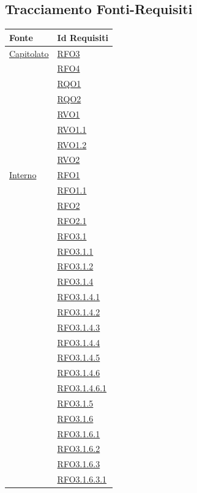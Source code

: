 \subsection{Tracciamento Fonti-Requisiti}
\normalsize
\begin{longtable}{|>{\centering}m{5cm}|m{5cm}<{\centering}|}
\hline
\textbf{Fonte} & \textbf{Id Requisiti}\\
\hline
\endhead
\hyperlink{Capitolato}{Capitolato} & \hyperlink{RFO3}{RFO3}\\
& \hyperlink{RFO4}{RFO4}\\
& \hyperlink{RQO1}{RQO1}\\
& \hyperlink{RQO2}{RQO2}\\
& \hyperlink{RVO1}{RVO1}\\
& \hyperlink{RVO1.1}{RVO1.1}\\
& \hyperlink{RVO1.2}{RVO1.2}\\
& \hyperlink{RVO2}{RVO2}\\ \hline
\hyperlink{Interno}{Interno} & \hyperlink{RFO1}{RFO1}\\
& \hyperlink{RFO1.1}{RFO1.1}\\
& \hyperlink{RFO2}{RFO2}\\
& \hyperlink{RFO2.1}{RFO2.1}\\
& \hyperlink{RFO3.1}{RFO3.1}\\
& \hyperlink{RFO3.1.1}{RFO3.1.1}\\
& \hyperlink{RFO3.1.2}{RFO3.1.2}\\
& \hyperlink{RFO3.1.4}{RFO3.1.4}\\
& \hyperlink{RFO3.1.4.1}{RFO3.1.4.1}\\
& \hyperlink{RFO3.1.4.2}{RFO3.1.4.2}\\
& \hyperlink{RFO3.1.4.3}{RFO3.1.4.3}\\
& \hyperlink{RFO3.1.4.4}{RFO3.1.4.4}\\
& \hyperlink{RFO3.1.4.5}{RFO3.1.4.5}\\
& \hyperlink{RFO3.1.4.6}{RFO3.1.4.6}\\
& \hyperlink{RFO3.1.4.6.1}{RFO3.1.4.6.1}\\
& \hyperlink{RFO3.1.5}{RFO3.1.5}\\
& \hyperlink{RFO3.1.6}{RFO3.1.6}\\
& \hyperlink{RFO3.1.6.1}{RFO3.1.6.1}\\
& \hyperlink{RFO3.1.6.2}{RFO3.1.6.2}\\
& \hyperlink{RFO3.1.6.3}{RFO3.1.6.3}\\
& \hyperlink{RFO3.1.6.3.1}{RFO3.1.6.3.1}\\

\end{longtable}
